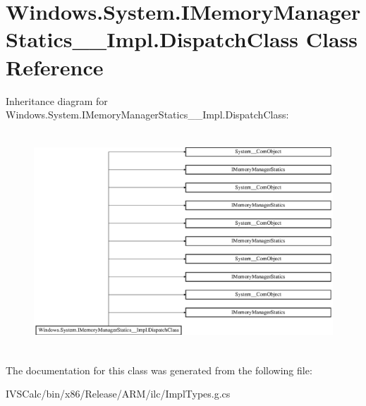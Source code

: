 \hypertarget{class_windows_1_1_system_1_1_i_memory_manager_statics_____impl_1_1_dispatch_class}{}\section{Windows.\+System.\+I\+Memory\+Manager\+Statics\+\_\+\+\_\+\+Impl.\+Dispatch\+Class Class Reference}
\label{class_windows_1_1_system_1_1_i_memory_manager_statics_____impl_1_1_dispatch_class}
Inheritance diagram for Windows.\+System.\+I\+Memory\+Manager\+Statics\+\_\+\+\_\+\+Impl.\+Dispatch\+Class\+:\begin{figure}[H]
\begin{center}
\leavevmode
\includegraphics[height=8.213333cm]{class_windows_1_1_system_1_1_i_memory_manager_statics_____impl_1_1_dispatch_class}
\end{center}
\end{figure}


The documentation for this class was generated from the following file\+:\begin{DoxyCompactItemize}
\item 
I\+V\+S\+Calc/bin/x86/\+Release/\+A\+R\+M/ilc/Impl\+Types.\+g.\+cs\end{DoxyCompactItemize}
